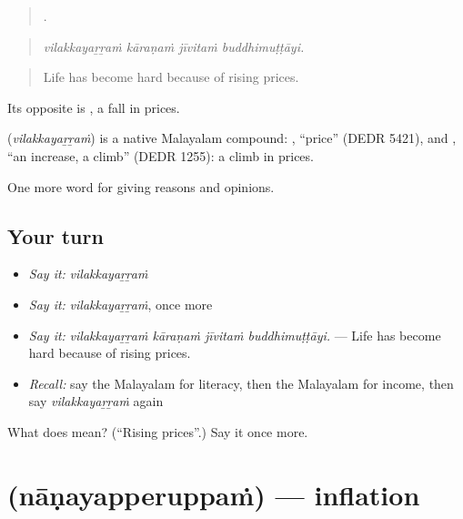 \begin{quote}
   .
\end{quote}

\begin{quote}
\emph{vilakkayaṟṟaṁ kāraṇaṁ jīvitaṁ buddhimuṭṭāyi.}
\end{quote}

\begin{quote}
Life has become hard because of rising prices.
\end{quote}

Its opposite is , a fall in prices.

\begin{cousinweb}
\textbf{} (\emph{vilakkayaṟṟaṁ}) is a native Malayalam compound: , \textquotedblleft{}price\textquotedblright{} (DEDR 5421), and , \textquotedblleft{}an increase, a climb\textquotedblright{} (DEDR 1255): a climb in prices.
\end{cousinweb}

\begin{grammarlens}[title={What you've built}]
One more word for giving reasons and opinions.
\end{grammarlens}

\subsection*{Your turn}
\begin{itemize}
\raggedright
  \item \emph{Say it:} \emph{vilakkayaṟṟaṁ}
  \item \emph{Say it:} \emph{vilakkayaṟṟaṁ}, once more
  \item \emph{Say it:} \emph{vilakkayaṟṟaṁ kāraṇaṁ jīvitaṁ buddhimuṭṭāyi.} — Life has become hard because of rising prices.
  \item \emph{Recall:} say the Malayalam for literacy, then the Malayalam for income, then say \emph{vilakkayaṟṟaṁ} again
\end{itemize}

\begin{tcolorbox}[breakable,colback=teal!4,colframe=teal!35!black,title={Before you move on}]
What does  mean? (\textquotedblleft{}Rising prices\textquotedblright{}.) Say it once more.
\end{tcolorbox}
\section[\texorpdfstring{\ml{നാണയപ്പെരുപ്പം} (nāṇayapperuppaṁ)}{നാണയപ്പെരുപ്പം (nāṇayapperuppaṁ)}]{ (nāṇayapperuppaṁ) — inflation}

